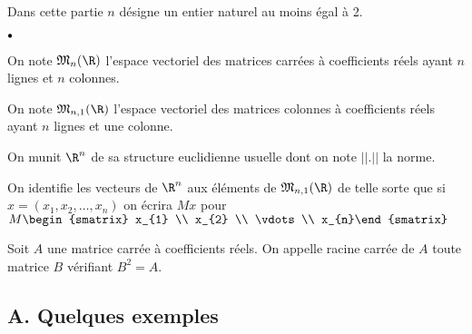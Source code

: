 \documentclass[11pt]{article}%
\begin{document}
Dans cette partie $n$ désigne un entier naturel au moins égal à 2.

\begin{noliste}{$\scriptstyle \bullet$}
\item On note $\mathfrak{M}_{n}(\R)$ l'espace vectoriel des matrices
carrées à coefficients réels ayant $n$ lignes et $n$ colonnes.

\item On note $\mathfrak{M}_{n,1}(\R)$ l'espace vectoriel des
matrices colonnes à coefficients réels ayant $n$ lignes et une colonne.

\item On munit $\R^{n}$ de sa structure euclidienne usuelle dont on
note $||.||$ la norme.

\item On identifie les vecteurs de $\R^{n}$ aux éléments de
$\mathfrak{M}_{n,1}(\R)$ de telle sorte que si $x =
(x_{1},x_{2},\ldots,x_{n})$ on écrira $Mx$ pour $M
\begin{smatrix}
x_{1} \\
x_{2} \\
\vdots \\
x_{n}\end{smatrix}
$

\item Soit $A$ une matrice carrée à coefficients réels. On appelle
racine
carrée de $A$ toute matrice $B$ vérifiant $B^{2} = A$.
\end{noliste}

\subsection*{A. Quelques exemples \ }
\end{document}
